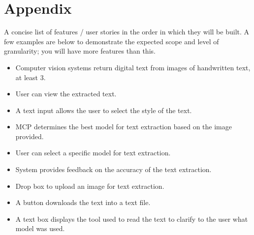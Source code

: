 \documentclass[12pt]{article}
\begin{document}
\section*{Appendix}
A concise list of features / user stories in the order in which they will be built. A few examples are below to demonstrate the expected scope and level of granularity; you will have more features than this.
\begin{itemize}
	\item Computer vision systems return digital text from images of handwritten text, at least 3.
	\item User can view the extracted text.
	\item A text input allows the user to select the style of the text.
	\item MCP determines the best model for text extraction based on the image provided.
	\item User can select a specific model for text extraction.
	\item System provides feedback on the accuracy of the text extraction.
	\item Drop box to upload an image for text extraction.
	\item A button downloads the text into a text file.
	\item A text box displays the tool used to read the text to clarify to the user what model was used.
\end{itemize}




\end{document}
